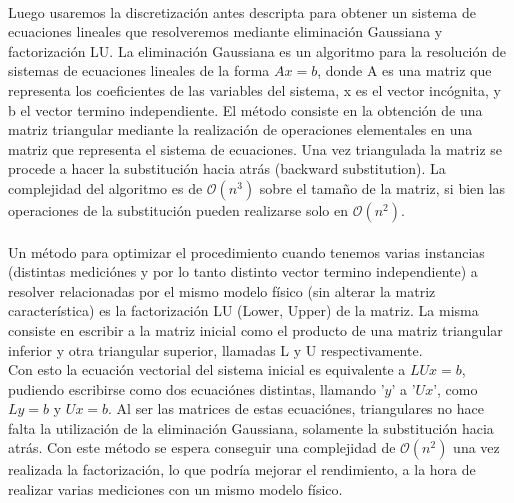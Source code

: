 ~

Luego usaremos la discretizaci\'on antes descripta para obtener un sistema de ecuaciones lineales que resolveremos mediante eliminaci\'on Gaussiana y factorizaci\'on LU. La eliminación Gaussiana es un algoritmo para la resolución de sistemas de ecuaciones lineales de la forma $Ax=b$, donde A es una matriz que representa los coeficientes de las variables del sistema, x es el vector inc\'ognita, y b el vector termino independiente. El m\'etodo consiste en la obtenci\'on de una matriz triangular mediante la realización de operaciones elementales en una matriz que representa el sistema de ecuaciones. Una vez triangulada la matriz se procede a hacer la substitución hacia atr\'as (backward substitution).
La complejidad del algoritmo es de $\mathcal{O}(n^{3})$ sobre el tamaño de la matriz, si bien las operaciones de la substitución pueden realizarse solo en $\mathcal{O}(n^{2})$.
\\
\\
Un m\'etodo para optimizar el procedimiento cuando tenemos varias instancias (distintas mediciónes y por lo tanto distinto vector termino independiente) a resolver relacionadas por el mismo modelo físico (sin alterar la matriz caracter\'istica) es la factorización LU (Lower, Upper) de la matriz. La misma consiste en escribir a la matriz inicial como el producto de una matriz triangular inferior y otra triangular superior, llamadas L y U respectivamente. 
\\
Con esto la ecuación vectorial del sistema inicial es equivalente a $LUx=b$, pudiendo escribirse como dos ecuaciónes distintas, llamando '$y$' a '$Ux$', como $Ly=b$ y $Ux = b$. Al ser las matrices de estas ecuaciónes, triangulares no hace falta la utilización de la eliminación Gaussiana, solamente la substitución hacia atr\'as. Con este m\'etodo se espera conseguir una complejidad de $\mathcal{O}(n^{2})$ una vez realizada la factorización, lo que podría mejorar el rendimiento, a la hora de realizar varias mediciones con un mismo modelo físico.


